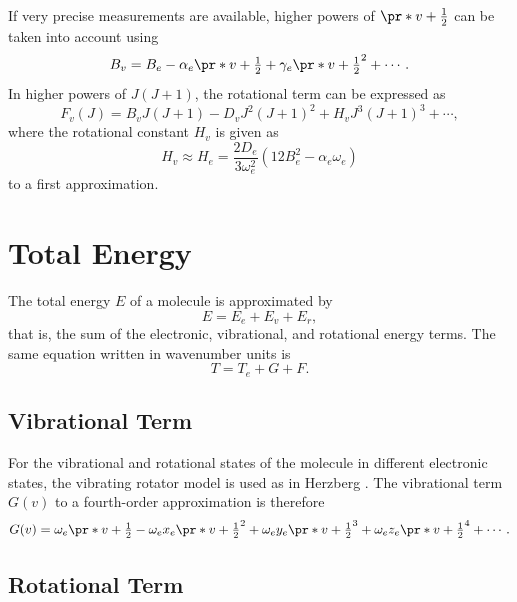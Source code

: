 \documentclass[11pt, twoside, fleqn]{report}
\begin{document}
If very precise measurements are available, higher powers of $\pr*{v + \tfrac{1}{2}}$ can be taken into account using
\begin{equation*}
    B_v = B_e - \alpha_e\pr*{v + \tfrac{1}{2}} + \gamma_e\pr*{v + \tfrac{1}{2}}^2 + \dotsb.
\end{equation*}
In higher powers of $J(J + 1)$, the rotational term can be expressed as
\begin{equation*}
    F_v(J) = B_vJ(J + 1) - D_vJ^2(J + 1)^2 + H_vJ^3(J + 1)^3 + \dotsb,
\end{equation*}
where the rotational constant $H_v$ is given as
\begin{equation*}
    H_v \approx H_e = \frac{2D_e}{3\omega_e^2}(12B_e^2 - \alpha_e\omega_e)
\end{equation*}
to a first approximation.

\chapter{Total Energy}
\label{c:total_energy}

The total energy $E$ of a molecule is approximated by
\begin{equation*}
    E = E_e + E_v + E_r,
\end{equation*}
that is, the sum of the electronic, vibrational, and rotational energy terms. The same equation written in wavenumber units is
\begin{equation}
    T = T_e + G + F.
\end{equation}

\section{Vibrational Term}
\label{s:vibrational_term}

For the vibrational and rotational states of the molecule in different electronic states, the vibrating rotator model is used as in Herzberg \cite{herzberg:spectra}. The vibrational term $G(v)$ to a fourth-order approximation is therefore
\begin{equation}
    G(v) = \omega_e\pr*{v + \tfrac{1}{2}} - \omega_ex_e\pr*{v + \tfrac{1}{2}}^2 + \omega_ey_e\pr*{v + \tfrac{1}{2}}^3 + \omega_ez_e\pr*{v + \tfrac{1}{2}}^4 + \dotsb.
\end{equation}

\section{Rotational Term}
\label{s:rotational_term}
\end{document}
